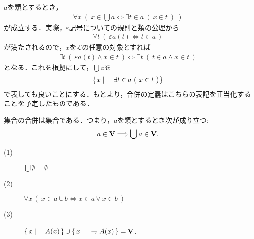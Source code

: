 	$a$を類とするとき，
	\begin{align}
		\forall x\ \left(\ x \in \bigcup a \Longleftrightarrow \exists t \in a\ (\ x \in t\ )\ \right)
	\end{align}
	が成立する．実際，$\varepsilon$記号についての規則と類の公理から
	\begin{align}
		\forall t\ \left(\ \varepsilon a(t) \Longleftrightarrow t \in a\ \right)
	\end{align}
	が満たされるので，$x$を$\mathcal{L}$の任意の対象とすれば
	\begin{align}
		\exists t\ (\ \varepsilon a(t) \wedge x \in t\ )
		\Longleftrightarrow \exists t\ (\ t \in a \wedge x \in t\ )
	\end{align}
	となる．これを根拠にして，$\bigcup a$を
	\begin{align}
		\left\{\, x \mid \quad \exists t \in a\ (\ x \in t\ )\, \right\}
	\end{align}
	で表しても良いことにする．もとより，合併の定義はこちらの表記を正当化することを予定したものである．
	
	
	\begin{screen}
		\begin{axm}[合併の公理]
			集合の合併は集合である．つまり，$a$を類とするとき次が成り立つ:
			\begin{align}
				a \in \mathbf{V} \Longrightarrow \bigcup a \in \mathbf{V}.
			\end{align}
		\end{axm}
	\end{screen}
	
	\begin{screen}
		\begin{thm}[合併の性質]\mbox{}
			\begin{description}
				\item[(1)] $\bigcup \emptyset = \emptyset$
				\item[(2)] $\forall x\ (\ x \in a \cup b \Longleftrightarrow x \in a \vee x \in b\ )$
				\item[(3)] $\left\{\, x \mid \quad A(x)\, \right\} \cup \left\{\, x \mid \quad \rightharpoondown A(x)\, \right\} = \mathbf{V}$.
			\end{description}
		\end{thm}
	\end{screen}
	
